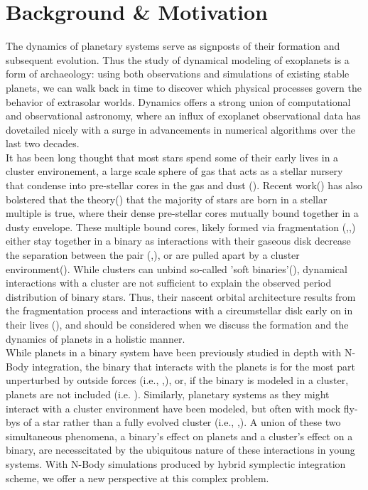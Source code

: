\documentclass[manuscript]{aastex631}
\begin{document}
\section{Background \& Motivation}
\indent The dynamics of planetary systems serve as signposts of their formation and subsequent evolution. Thus the study of dynamical modeling 
of exoplanets is a form of archaeology: using both observations and simulations of existing stable planets, we can walk back in 
time to discover which physical processes govern the behavior of extrasolar worlds.  Dynamics offers a strong union of computational 
and observational astronomy, where an influx of exoplanet observational data has dovetailed nicely with a surge in advancements in numerical algorithms
over the last two decades. \\
\indent It has been long thought that most stars spend some of their early lives in a cluster environement, a large scale sphere of gas that acts as a stellar nursery
 that condense into pre-stellar cores in the gas and dust (\cite{lad03}). Recent work(\cite{sad17}) has also bolstered that the theory(\cite{kro95}) that the majority of stars 
 are born in a stellar multiple is true, where their dense pre-stellar cores mutually bound together in a dusty envelope. 
 These multiple bound cores, likely formed
 via fragmentation (\cite{bon94},\cite{bat03},\cite{tur09}) either stay together in a binary as interactions with their gaseous
 disk decrease the separation between the pair (\cite{bat00},\cite{bat03}), or are pulled apart by a cluster environment(\cite{kro01}). 
 While clusters can unbind so-called 'soft binaries'(\cite{kro01}), dynamical interactions with a cluster are not sufficient to explain the observed
 period distribution of binary stars. Thus, their nascent orbital architecture results from the fragmentation process and interactions with a circumstellar disk
 early on in their lives (\cite{krobur01}), and should be considered when we discuss the formation and the dynamics of planets in a holistic manner.\\
 \indent While planets in a binary system have been 
 previously studied in depth with N-Body integration, the binary that interacts with the planets is for the most part unperturbed by outside forces 
 (i.e., \cite{hol99},\cite{hag07}),
 or, if the binary is modeled in a cluster, planets are not included (i.e. \cite{krobur01}). Similarly, planetary systems as they might interact with a cluster environment
 have been modeled, but often with mock fly-bys of a star rather than a fully evolved cluster (i.e., \cite{rec09},\cite{cat20}). A union of these two simultaneous phenomena,
 a binary's effect on planets and a cluster's effect on a binary, are necesscitated by the ubiquitous nature of these interactions in young systems. With N-Body simulations
 produced by hybrid symplectic integration scheme, we offer a new perspective at this complex problem. 
\end{document}
